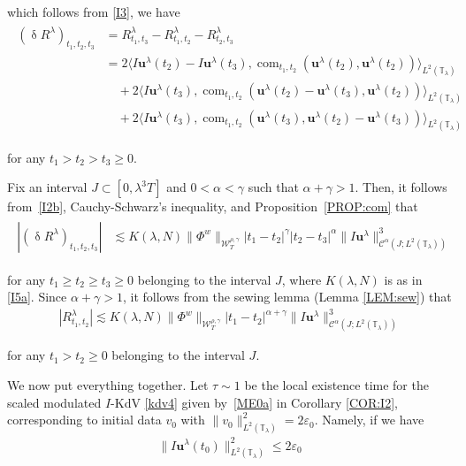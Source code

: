 \documentclass[letterpaper, 11pt,  reqno]{amsart}
\DeclareMathOperator{\com}{com}
\newcommand{\1}{\hspace{0.5mm}\text{I}\hspace{0.5mm}}
\newcommand{\noi}{\noindent}
\newcommand{\T}{\mathbb{T}}
\newcommand{\CC}{\mathcal{C}}
\newcommand{\al}{\alpha}
\newcommand{\updl}{\updelta}
\newcommand{\eps}{\varepsilon}
\newcommand{\g}{\gamma}
\newcommand{\ld}{\lambda}
\newcommand{\les}{\lesssim}
\newcommand{\W}{\mathcal{W}}
\newcommand{\uu}{\mathbf{u}}
\numberwithin{equation}{section}
\numberwithin{theorem}{section}
\begin{document}
%
\noi
which follows from \eqref{I3}, 
we have 
\begin{align}
\begin{aligned}
(\updl R^\ld)_{t_1, t_2, t_3} 
& = R^\ld_{t_1,t_3}-  R^\ld_{t_1, t_2}-   R^\ld_{t_2, t_3}\\
&=
2\big\langle 
I \uu^\ld(t_2) - I \uu^\ld(t_3)  ,   \com_{t_1, t_2}(\uu^\ld(t_2), \uu^\ld(t_2))
\big\rangle_{L^2(\T_\ld)} \\
& \quad + 2 \big\langle 
I \uu^\ld(t_3)  ,   \com_{t_1, t_2}(\uu^\ld(t_2)- \uu^\ld(t_3), \uu^\ld(t_2))
\big\rangle_{L^2(\T_\ld)}\\
& \quad + 2 \big\langle 
I \uu^\ld(t_3)  ,   \com_{t_1, t_2}(\uu^\ld(t_3), \uu^\ld(t_2)- \uu^\ld(t_3))
\big\rangle_{L^2(\T_\ld)}
\end{aligned}
\label{I2b}
\end{align}

\noi
for any  $t_1 >   t_2> t_3\ge 0$.

Fix an interval $J \subset [0, \ld^3T]$
and $0 < \al < \g$ such that $\al + \g > 1$.
Then, it follows from~\eqref{I2b}, Cauchy-Schwarz's inequality, 
and Proposition~\ref{PROP:com}
%
that  
\begin{align*}
\begin{aligned}
|(\updl R^\ld)_{t_1, t_2, t_3} |
&\les K(\ld, N)   \|  \Phi^{w}  \|_{\W_{T}^{\rho, \g}}   
|t_1-t_2|^{\g}
|t_2-t_3|^{\al}\|I \uu^\ld \|^3_{\CC^\al (J;L^2(\T_\ld))}
\end{aligned}
\end{align*}


\noi
for any 
$t_1 \ge   t_2\ge t_3\ge 0$
belonging to the interval $J$, 
where $K(\ld, N)$ is as in \eqref{I5a}.
Since $\al + \g > 1$, 
it follows from the sewing lemma 
(Lemma \ref{LEM:sew}) 
that 
\begin{align}
|  R^\ld_{t_1,t_2} | \les 
K(\ld, N)   \|  \Phi^{w}  \|_{\W_{T}^{\rho, \g}}   
|t_1-t_2|^{\al + \g}  \|I \uu^\ld \|^3_{\CC^\al (J;L^2(\T_\ld))}
\label{I2x}
\end{align}

\noi
for any 
$t_1 >   t_2\ge 0$
belonging to the interval $J$.



We now put everything together.
Let   $\tau \sim 1$ be  the local existence time
for the scaled modulated $I$-KdV \eqref{kdv4}
given by~\eqref{ME0a} in Corollary \ref{COR:I2}, 
corresponding to initial data $v_0$ with 
$\|v_0 \|_{L^2(\T_\ld)}^2
= 2\eps_0$.
Namely, if we have 
\begin{align}
 \|I\uu^\ld(t_0)\|_{L^2(\T_\ld)}^2 \le 2\eps_0
\label{I2c}
\end{align}
\end{document}
